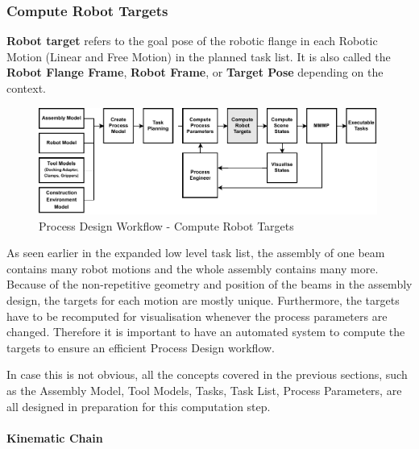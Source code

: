 \FloatBarrier

\subsubsection{Compute Robot Targets}
\label{subsubsection:exploration-3-compute-robot-targets}

\textbf{Robot target }refers to the goal pose of the robotic flange in each Robotic Motion (Linear and Free Motion) in the planned task list. It is also called the \textbf{Robot Flange Frame}, \textbf{Robot Frame}, or \textbf{Target Pose} depending on the context.

\begin{figure}[!h]
    \centering
    \includegraphics[width=0.99\textwidth]{images/6a/process_4.pdf}
    \caption{Process Design Workflow - Compute Robot Targets}
    \label{fig:process-design-4}
\end{figure}

As seen earlier in the expanded low level task list, the assembly of one beam contains many robot motions and the whole assembly contains many more. Because of the non-repetitive geometry and position of the beams in the assembly design, the targets for each motion are mostly unique. Furthermore, the targets have to be recomputed for visualisation whenever the process parameters are changed. Therefore it is important to have an automated system to compute the targets to ensure an efficient Process Design workflow.

In case this is not obvious, all the concepts covered in the previous sections, such as the Assembly Model, Tool Models, Tasks, Task List, Process Parameters, are all designed in preparation for this computation step.

\paragraph{Kinematic Chain}

